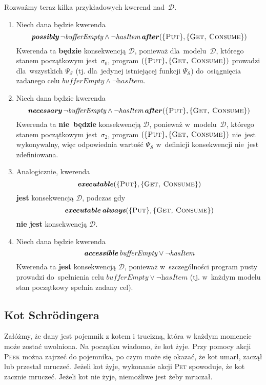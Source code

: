 \documentclass[11pt,a4paper]{article}
\DeclareMathOperator{\After}{\textbf{\textit{after}}}
\DeclareMathOperator{\Always}{\textbf{\textit{always}}}
\DeclareMathOperator{\Executable}{\textbf{\textit{executable}}}
\DeclareMathOperator{\Accessible}{\textbf{\textit{accessible}}}
\DeclareMathOperator{\Possibly}{\textbf{\textit{possibly}}}
\DeclareMathOperator{\Necessary}{\textbf{\textit{necessary}}}
\begin{document}
Rozważmy teraz kilka przykładowych kwerend nad~$\mathcal{D}$.

\begin{enumerate}
    \item Niech dana będzie kwerenda
    $$ \Possibly \neg \textit{bufferEmpty} \land \neg \textit{hasItem} \After (\{ \textsc{Put} \}, \{ \textsc{Get, Consume} \}) $$
    Kwerenda ta \textbf{będzie} konsekwencją $\mathcal{D}$, ponieważ dla~modelu~$\mathcal{D}$, którego stanem początkowym jest~$\sigma_0$, program $(\{ \textsc{Put} \}, \{ \textsc{Get, Consume} \})$ prowadzi dla~wszystkich $\Psi_\mathcal{S}$ (tj. dla~jedynej istniejącej funkcji $\Psi_\mathcal{S}$) do~osiągnięcia zadanego celu $\textit{bufferEmpty} \land \neg \textit{hasItem}$.

    \item Niech dana będzie kwerenda
    $$ \Necessary \neg \textit{bufferEmpty} \land \neg \textit{hasItem} \After (\{ \textsc{Put} \}, \{ \textsc{Get, Consume} \}) $$
    Kwerenda ta \textbf{nie~będzie} konsekwencją $\mathcal{D}$, ponieważ w~modelu~$\mathcal{D}$, którego stanem początkowym jest~$\sigma_2$, program $(\{ \textsc{Put} \}, \{ \textsc{Get, Consume} \})$ nie~jest wykonywalny, więc odpowiednia wartość $\Psi_\mathcal{S}$ w~definicji konsekwencji nie~jest zdefiniowana.

    \item Analogicznie, kwerenda
    $$\Executable (\{ \textsc{Put} \}, \{ \textsc{Get, Consume} \})$$
    \textbf{jest} konsekwencją $\mathcal{D}$, podczas gdy
    $$\Executable \Always (\{ \textsc{Put} \}, \{ \textsc{Get, Consume} \})$$
    \textbf{nie jest} konsekwencją $\mathcal{D}$.

    \item Niech dana będzie kwerenda
    $$ \Accessible \textit{bufferEmpty} \lor \neg \textit{hasItem} $$
    Kwerenda ta \textbf{jest} konsekwencją $\mathcal{D}$, ponieważ w~szczególności program pusty prowadzi do~spełnienia celu $\textit{bufferEmpty} \lor \neg \textit{hasItem}$ (tj. w~każdym modelu stan początkowy spełnia zadany cel).
\end{enumerate}

\subsection{Kot Schrödingera}
Załóżmy, że dany jest pojemnik z kotem i trucizną, która w każdym momencie może zostać uwolniona. Na początku wiadomo, że kot żyje. Przy pomocy akcji \textsc{Peek} można zajrzeć do pojemnika, po czym może się okazać, że kot umarł, zaczął lub przestał mruczeć. Jeżeli kot żyje, wykonanie akcji \textsc{Pet} spowoduje, że kot zacznie mruczeć. Jeżeli kot nie żyje, niemożliwe jest żeby mruczał.
\end{document}
